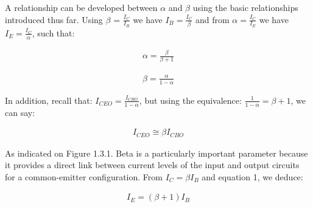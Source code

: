 A relationship can be developed between $\alpha$ and $\beta$ using the basic relationships introduced thus far. Using $\beta$ = $\frac{I_{C}}{I_{B}}$ we have $I_{B} = \frac{I_{C}}{\beta}$ and from $\alpha = \frac{I_{C}}{I_{E}}$ we have $I_{E} = \frac{I_{C}}{\alpha}$, such that:

\begin{ceqn}
\begin{align}
\alpha = \frac{\beta}{\beta + 1}
\end{align}
\end{ceqn}

\begin{ceqn}
\begin{align}
\beta = \frac{\alpha}{1 - \alpha}
\end{align}
\end{ceqn}

In addition, recall that: $I_{CEO} = \frac{I_{CBO}}{1 - \alpha}$, but using the equivalence: $\frac{1}{1 - \alpha} = \beta + 1$, we can say:

\begin{ceqn}
\begin{align}
I_{CEO} \cong \beta I_{CBO}
\end{align}
\end{ceqn}

As indicated on Figure 1.3.1. Beta is a particularly important parameter because it provides a direct link between current levels of the input and output circuits for a common-emitter configuration. From $I_{C} = \beta I_{B}$ and equation 1, we deduce:

\begin{ceqn}
\begin{align}
I_{E} = ( \beta + 1 ) I_{B}
\end{align}
\end{ceqn}

\pagebreak
